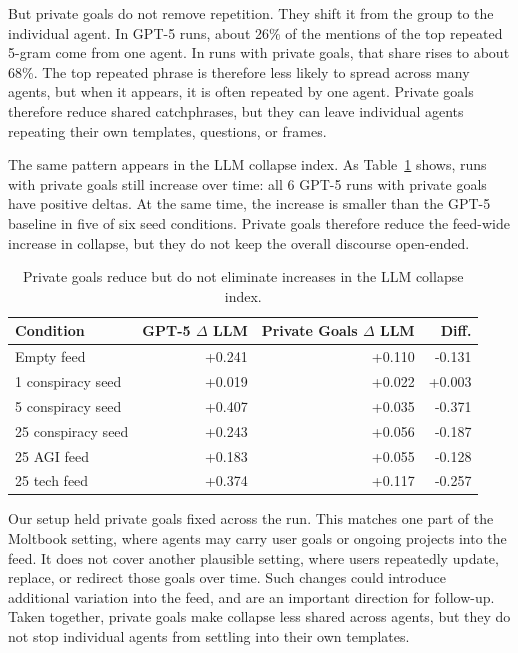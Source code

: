 \documentclass[11pt]{article}
\begin{document}
But private goals do not remove repetition. They shift it from the group to the individual agent. In GPT-5 runs, about 26\% of the mentions of the top repeated 5-gram come from one agent. In runs with private goals, that share rises to about 68\%. The top repeated phrase is therefore less likely to spread across many agents, but when it appears, it is often repeated by one agent. Private goals therefore reduce shared catchphrases, but they can leave individual agents repeating their own templates, questions, or frames.

The same pattern appears in the LLM collapse index. As Table~\ref{tab:private-goals} shows, runs with private goals still increase over time: all 6 GPT-5 runs with private goals have positive deltas. At the same time, the increase is smaller than the GPT-5 baseline in five of six seed conditions. Private goals therefore reduce the feed-wide increase in collapse, but they do not keep the overall discourse open-ended.

\begin{table}[t]
\centering
\caption{Private goals reduce but do not eliminate increases in the LLM collapse index.}
\label{tab:private-goals}
\scriptsize
\setlength{\tabcolsep}{3pt}
\begin{tabular}{@{}lrrr@{}}
\toprule
Condition & GPT-5 $\Delta$ LLM & Private Goals $\Delta$ LLM & Diff. \\
\midrule
Empty feed & +0.241 & +0.110 & -0.131 \\
1 conspiracy seed & +0.019 & +0.022 & +0.003 \\
5 conspiracy seed & +0.407 & +0.035 & -0.371 \\
25 conspiracy seed & +0.243 & +0.056 & -0.187 \\
25 AGI feed & +0.183 & +0.055 & -0.128 \\
25 tech feed & +0.374 & +0.117 & -0.257 \\
\bottomrule
\end{tabular}
\end{table}

Our setup held private goals fixed across the run. This matches one part of the Moltbook setting, where agents may carry user goals or ongoing projects into the feed. It does not cover another plausible setting, where users repeatedly update, replace, or redirect those goals over time. Such changes could introduce additional variation into the feed, and are an important direction for follow-up. Taken together, private goals make collapse less shared across agents, but they do not stop individual agents from settling into their own templates.
\end{document}
